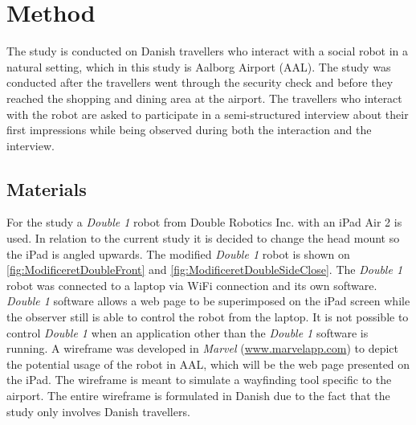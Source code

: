 \section{Method}
\label{Method}
%
The study is conducted on Danish travellers who interact with a social robot in a natural setting, which in this study is Aalborg Airport (AAL). The study was conducted after the travellers went through the security check and before they reached the shopping and dining area at the airport. The travellers who interact with the robot are asked to participate in a semi-structured interview about their first impressions while being observed during both the interaction and the interview. 

\subsection{Materials}
For the study a \textit{Double 1} robot from Double Robotics Inc. with an iPad Air 2 is used. In relation to the current study it is decided to change the head mount so the iPad is angled upwards. The modified \textit{Double 1} robot is shown on \autoref{fig:ModificeretDoubleFront} and \autoref{fig:ModificeretDoubleSideClose}. The \textit{Double 1} robot was connected to a laptop via WiFi connection and its own software. \textit{Double 1} software allows a web page to be superimposed on the iPad screen while the observer still is able to control the robot from the laptop. It is not possible to control \textit{Double 1} when an application other than the \textit{Double 1} software is running. A wireframe was developed in \textit{Marvel} (\url{www.marvelapp.com}) to depict the potential usage of the robot in AAL, which will be the web page presented on the iPad. The wireframe is meant to simulate a wayfinding tool specific to the airport. The entire wireframe is formulated in Danish due to the fact that the study only involves Danish travellers.
%
